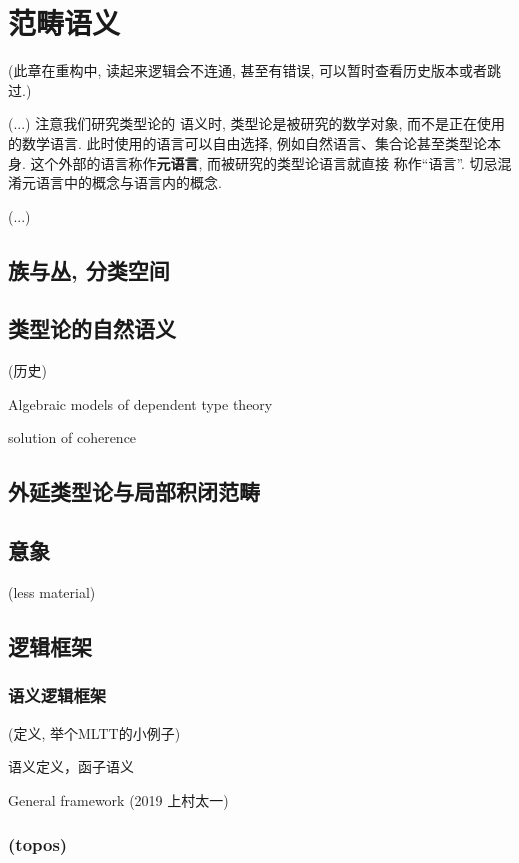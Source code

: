 \chapter{范畴语义}

(此章在重构中, 读起来逻辑会不连通, 甚至有错误, 可以暂时查看历史版本或者跳过.)

(...) 注意我们研究类型论的
语义时, 类型论是被研究的数学对象, 而不是正在使用的数学语言.
此时使用的语言可以自由选择, 例如自然语言、集合论甚至类型论本身.
这个外部的语言称作\textbf{元语言}, 而被研究的类型论语言就直接
称作“语言”. 切忌混淆元语言中的概念与语言内的概念.

(...)

\section{族与丛, 分类空间}

\section{类型论的自然语义}

(历史)

Algebraic models of dependent type theory

solution of coherence

\section{外延类型论与局部积闭范畴}

\section{意象}

(less material)

\section{逻辑框架}

\subsection{语义逻辑框架}

(定义, 举个MLTT的小例子)

语义定义，函子语义

General framework (2019 上村太一)
\cite{uemura:2019:general}

\subsection{(topos)}

